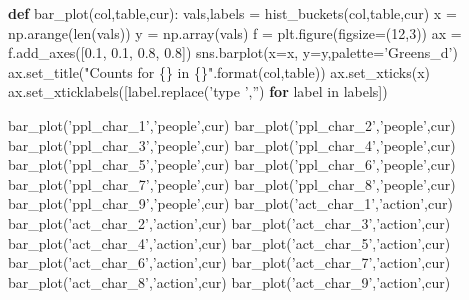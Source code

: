 \documentclass[]{report}
\newenvironment{Shaded}{}{}
\newcommand{\KeywordTok}[1]{\textcolor[rgb]{0.00,0.44,0.13}{\textbf{{#1}}}}
\newcommand{\DecValTok}[1]{\textcolor[rgb]{0.25,0.63,0.44}{{#1}}}
\newcommand{\FloatTok}[1]{\textcolor[rgb]{0.25,0.63,0.44}{{#1}}}
\newcommand{\StringTok}[1]{\textcolor[rgb]{0.25,0.44,0.63}{{#1}}}
\newcommand{\ControlFlowTok}[1]{\textcolor[rgb]{0.00,0.44,0.13}{\textbf{{#1}}}}
\newcommand{\OperatorTok}[1]{\textcolor[rgb]{0.40,0.40,0.40}{{#1}}}
\newcommand{\BuiltInTok}[1]{{#1}}
\newcommand{\NormalTok}[1]{{#1}}
\begin{document}
\begin{Shaded}
\begin{Highlighting}[]
\KeywordTok{def} \NormalTok{bar_plot(col,table,cur):}
    \NormalTok{vals,labels }\OperatorTok{=} \NormalTok{hist_buckets(col,table,cur)}
    \NormalTok{x }\OperatorTok{=} \NormalTok{np.arange(}\BuiltInTok{len}\NormalTok{(vals))}
    \NormalTok{y }\OperatorTok{=} \NormalTok{np.array(vals)}
    \NormalTok{f }\OperatorTok{=} \NormalTok{plt.figure(figsize}\OperatorTok{=}\NormalTok{(}\DecValTok{12}\NormalTok{,}\DecValTok{3}\NormalTok{))}
    \NormalTok{ax }\OperatorTok{=} \NormalTok{f.add_axes([}\FloatTok{0.1}\NormalTok{, }\FloatTok{0.1}\NormalTok{, }\FloatTok{0.8}\NormalTok{, }\FloatTok{0.8}\NormalTok{])}
    \NormalTok{sns.barplot(x}\OperatorTok{=}\NormalTok{x, y}\OperatorTok{=}\NormalTok{y,palette}\OperatorTok{=}\StringTok{'Greens_d'}\NormalTok{)}
    \NormalTok{ax.set_title(}\StringTok{"Counts for \{\} in \{\}"}\NormalTok{.}\BuiltInTok{format}\NormalTok{(col,table))}
    \NormalTok{ax.set_xticks(x)}
    \NormalTok{ax.set_xticklabels([label.replace(}\StringTok{'type '}\NormalTok{,}\StringTok{''}\NormalTok{) }\ControlFlowTok{for} \NormalTok{label }\OperatorTok{in} \NormalTok{labels])}
\end{Highlighting}
\end{Shaded}

\begin{Shaded}
\begin{Highlighting}[]
\NormalTok{bar_plot(}\StringTok{'ppl_char_1'}\NormalTok{,}\StringTok{'people'}\NormalTok{,cur)}
\NormalTok{bar_plot(}\StringTok{'ppl_char_2'}\NormalTok{,}\StringTok{'people'}\NormalTok{,cur)}
\NormalTok{bar_plot(}\StringTok{'ppl_char_3'}\NormalTok{,}\StringTok{'people'}\NormalTok{,cur)}
\NormalTok{bar_plot(}\StringTok{'ppl_char_4'}\NormalTok{,}\StringTok{'people'}\NormalTok{,cur)}
\NormalTok{bar_plot(}\StringTok{'ppl_char_5'}\NormalTok{,}\StringTok{'people'}\NormalTok{,cur)}
\NormalTok{bar_plot(}\StringTok{'ppl_char_6'}\NormalTok{,}\StringTok{'people'}\NormalTok{,cur)}
\NormalTok{bar_plot(}\StringTok{'ppl_char_7'}\NormalTok{,}\StringTok{'people'}\NormalTok{,cur)}
\NormalTok{bar_plot(}\StringTok{'ppl_char_8'}\NormalTok{,}\StringTok{'people'}\NormalTok{,cur)}
\NormalTok{bar_plot(}\StringTok{'ppl_char_9'}\NormalTok{,}\StringTok{'people'}\NormalTok{,cur)}
\NormalTok{bar_plot(}\StringTok{'act_char_1'}\NormalTok{,}\StringTok{'action'}\NormalTok{,cur)}
\NormalTok{bar_plot(}\StringTok{'act_char_2'}\NormalTok{,}\StringTok{'action'}\NormalTok{,cur)}
\NormalTok{bar_plot(}\StringTok{'act_char_3'}\NormalTok{,}\StringTok{'action'}\NormalTok{,cur)}
\NormalTok{bar_plot(}\StringTok{'act_char_4'}\NormalTok{,}\StringTok{'action'}\NormalTok{,cur)}
\NormalTok{bar_plot(}\StringTok{'act_char_5'}\NormalTok{,}\StringTok{'action'}\NormalTok{,cur)}
\NormalTok{bar_plot(}\StringTok{'act_char_6'}\NormalTok{,}\StringTok{'action'}\NormalTok{,cur)}
\NormalTok{bar_plot(}\StringTok{'act_char_7'}\NormalTok{,}\StringTok{'action'}\NormalTok{,cur)}
\NormalTok{bar_plot(}\StringTok{'act_char_8'}\NormalTok{,}\StringTok{'action'}\NormalTok{,cur)}
\NormalTok{bar_plot(}\StringTok{'act_char_9'}\NormalTok{,}\StringTok{'action'}\NormalTok{,cur)}
\end{Highlighting}
\end{Shaded}
\end{document}

